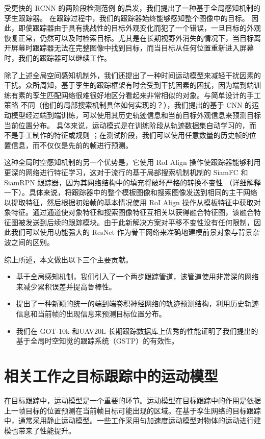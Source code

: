 受更快的 RCNN 的两阶段检测范例 \cite{ren2015faster} 的启发，我们提出了一种基于全局感知机制的孪生跟踪器。
在跟踪过程中，我们的跟踪器始终能够感知整个图像中的目标。
因此，即使跟踪器由于具有挑战性的目标外观变化而犯了一个错误，一旦目标的外观恢复正常，仍然可以及时检索目标。尤其是在长期视野外消失的情况下，当目标离开屏幕时跟踪器无法在完整图像中找到目标，而当目标从任何位置重新进入屏幕时，我们的跟踪器可以继续工作。

除了上述全局空间感知机制外，我们还提出了一种时间运动模型来减轻干扰因素的干扰。众所周知，基于孪生的跟踪框架有时会受到干扰因素的困扰，因为端到端训练有素的孪生匹配网络很难很好地区分看起来非常相似的对象。与简单设计的手工策略 \cite{SiamFC, SiamRPN} 不同（他们的局部搜索机制具体如何实现的？），我们提出的基于 CNN 的运动模型经过端到端训练，可以使用其历史轨迹信息和当前目标外观信息来预测目标当前位置分布。
具体来说，运动模式是在训练阶段从轨迹数据集自动学习的，而不是手工制作的特征或规则 \cite{iswanto2017visual}；在测试阶段，我们可以使用任意数量的历史帧的位置信息，而不仅仅是先前的帧进行预测。

这种全局时空感知机制的另一个优势是，它使用 RoI Align \cite{He2018MaskR} 操作使跟踪器能够利用更深的网络进行特征学习，这对于流行的基于局部搜索机制机制的 SiamFC \cite{SiamFC} 和 SiamRPN \cite{SiamRPN} 跟踪器，因为其网络结构中的填充将破坏严格的转换不变性 \cite{SiamRPN++}（详细解释一下）。具体来说，将跟踪器中的整个模板图像和搜索图像发送到相同的主干网络以提取特征，然后根据初始帧的基本情况使用 RoI Align 操作从模板特征中获取对象特征。通过通道使对象特征和搜索图像特征互相关以获得融合特征图，该融合特征图被发送到后续的跟踪模块。由于此新解决方案对平移不变性没有任何限制，因此我们可以使用功能强大的 ResNet \cite{he2016deep} 作为骨干网络来准确地建模前景对象与背景杂波之间的区别。

综上所述，本文做出以下三个主要贡献。
\begin{itemize}
\item 基于全局感知机制，我们引入了一个两步跟踪管道，该管道使用非常深的网络来减少累积误差并提高鲁棒性。
\item 提出了一种新颖的统一的端到端卷积神经网络的轨迹预测结构，利用历史轨迹信息和当前帧的出现信息来预测目标位置分布。
\item 我们在 GOT-10k \cite{GOT-10k} 和UAV20L \cite{mueller2016benchmark} 长期跟踪数据库上优秀的性能证明了我们提出的基于全局时空知觉的跟踪系统（GSTP）的有效性。
\end{itemize}

\section{相关工作之目标跟踪中的运动模型}
在目标跟踪中，运动模型是一个重要的环节。运动模型在目标跟踪中的作用是依据上一帧目标的位置预测在当前帧目标可能出现的区域。在基于孪生网络的目标跟踪中，通常采用静止运动模型。一些工作采用匀加速度运动模型对物体的运动进行建模也带来了性能提升。

